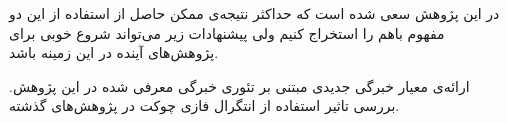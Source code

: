 در این پژوهش سعی شده است که حداکثر نتیجه‌ی ممکن حاصل از استفاده از این دو مفهوم باهم را استخراج کنیم ولی پیشنهادات زیر می‌تواند شروع خوبی برای پژوهش‌های آینده در این زمینه باشد.

\begin{enumerate}
 ارائه‌ی معیار خبرگی جدیدی مبتنی بر تئوری خبرگی معرفی شده در این پژوهش.
 بررسی تاثیر استفاده از انتگرال فازی چوکت در پژوهش‌های گذشته.
\end{enumerate}